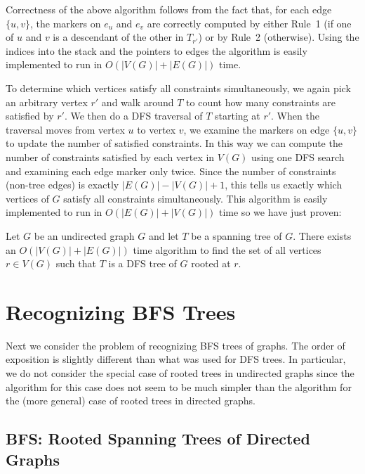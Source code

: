 \documentclass[lotsofwhite]{patmorin}
\begin{document}
Correctness of the above algorithm follows from the fact that, for
each edge $\{u,v\}$, the markers on $e_u$ and $e_v$ are correctly
computed by either Rule~1 (if one of $u$ and $v$ is a descendant of
the other in $T_{r'}$) or by Rule~2 (otherwise).  Using the indices
into the stack and the pointers to edges the algorithm is easily
implemented to run in $O(|V(G)|+|E(G)|)$ time.

To determine which vertices satisfy all constraints simultaneously, we
again pick an arbitrary vertex $r'$ and walk around $T$ to count how
many constraints are satisfied by $r'$.  We then do a DFS traversal of
$T$ starting at $r'$. When the traversal moves from vertex $u$ to
vertex $v$, we examine the markers on edge $\{u,v\}$ to update the
number of satisfied constraints. In this way we can compute the number
of constraints satisfied by each vertex in $V(G)$ using one DFS search
and examining each edge marker only twice. Since the number of
constraints (non-tree edges) is exactly $|E(G)|-|V(G)|+1$, this tells
us exactly which vertices of $G$ satisfy all constraints
simultaneously.  This algorithm is easily implemented to run in
$O(|E(G)|+|V(G)|)$ time so we have just proven:

\begin{thm} 
Let $G$ be an undirected graph $G$ and let $T$ be a spanning
tree of $G$.  There exists an $O(|V(G)|+|E(G)|)$ time algorithm to find the
set of all vertices $r\in V(G)$ such that $T$ is a DFS tree of $G$
rooted at $r$.  
\end{thm}


\section{Recognizing BFS Trees}

Next we consider the problem of recognizing BFS trees of graphs.  The
order of exposition is slightly different than what was used for DFS
trees.  In particular, we do not consider the special case of rooted
trees in undirected graphs since the algorithm for this case does not
seem to be much simpler than the algorithm for the (more general) case
of rooted trees in directed graphs.

\subsection{BFS: Rooted Spanning Trees of Directed Graphs}
\end{document}
